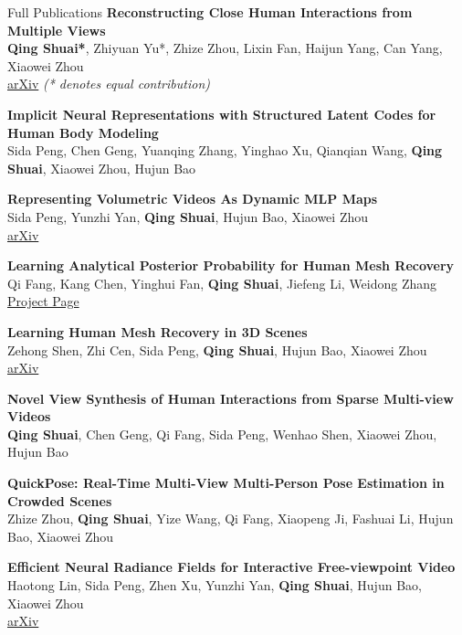 \begin{rSection}{Full Publications}
    {\bf Reconstructing Close Human Interactions from Multiple Views}\hfill{ } \\
    \textbf{Qing Shuai*}, Zhiyuan Yu*, Zhize Zhou, Lixin Fan, Haijun Yang, Can Yang, Xiaowei Zhou\\
    \href{https://arxiv.org/abs/2401.16173}{arXiv} {\em (* denotes equal contribution)}

    {\bf Implicit Neural Representations with Structured Latent Codes for Human Body Modeling}\hfill{ } \\
    Sida Peng, Chen Geng, Yuanqing Zhang, Yinghao Xu, Qianqian Wang, \textbf{Qing Shuai}, Xiaowei Zhou, Hujun Bao

    {\bf Representing Volumetric Videos As Dynamic MLP Maps}\hfill{ } \\
    Sida Peng, Yunzhi Yan, \textbf{Qing Shuai}, Hujun Bao, Xiaowei Zhou\\
    \href{https://arxiv.org/abs/2304.06717}{arXiv}

    {\bf Learning Analytical Posterior Probability for Human Mesh Recovery}\hfill{ } \\
    Qi Fang, Kang Chen, Yinghui Fan, \textbf{Qing Shuai}, Jiefeng Li, Weidong Zhang\\
    \href{https://netease-gameai.github.io/ProPose/}{Project Page}

    {\bf Learning Human Mesh Recovery in 3D Scenes}\hfill{ } \\
    Zehong Shen, Zhi Cen, Sida Peng, \textbf{Qing Shuai}, Hujun Bao, Xiaowei Zhou\\
    \href{https://arxiv.org/abs/2306.03847}{arXiv}

    {\bf Novel View Synthesis of Human Interactions from Sparse Multi-view Videos}\hfill{ } \\
    \textbf{Qing Shuai}, Chen Geng, Qi Fang, Sida Peng, Wenhao Shen, Xiaowei Zhou, Hujun Bao

    {\bf QuickPose: Real-Time Multi-View Multi-Person Pose Estimation in Crowded Scenes}\hfill{ } \\
    Zhize Zhou, \textbf{Qing Shuai}, Yize Wang, Qi Fang, Xiaopeng Ji, Fashuai Li, Hujun Bao, Xiaowei Zhou

    {\bf Efficient Neural Radiance Fields for Interactive Free-viewpoint Video}\hfill{ } \\
    Haotong Lin, Sida Peng, Zhen Xu, Yunzhi Yan, \textbf{Qing Shuai}, Hujun Bao, Xiaowei Zhou\\
    \href{https://arxiv.org/abs/2112.01517}{arXiv}


\end{rSection}
